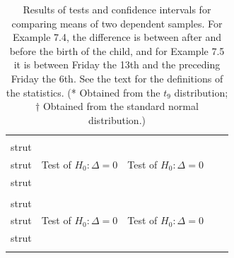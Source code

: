 \documentclass[11pt,a4paper,openany]{book}
\begin{document}
\begin{longtable}[]{@{}rrrrr@{}}
\caption{\label{tab:t-2tests-dep} Results of tests and confidence intervals
for comparing means of two dependent samples. For Example 7.4, the
difference is between after and before the birth of the child, and for
Example 7.5 it is between Friday the 13th and the preceding Friday the
6th. See the text for the definitions of the statistics. (* Obtained
from the \(t_{9}\) distribution; \(\dagger\) Obtained from the standard
normal distribution.)}\tabularnewline
\toprule
\begin{minipage}[b]{0.29\columnwidth}\raggedleft\strut
\\strut
\end{minipage} & \begin{minipage}[b]{0.13\columnwidth}\raggedleft\strut
\\strut
\end{minipage} & \begin{minipage}[b]{0.18\columnwidth}\raggedleft\strut
Test of \(H_{0}: \Delta=0\)\strut
\end{minipage} & \begin{minipage}[b]{0.13\columnwidth}\raggedleft\strut
Test of \(H_{0}: \Delta=0\)\strut
\end{minipage} & \begin{minipage}[b]{0.12\columnwidth}\raggedleft\strut
\\strut
\end{minipage}\tabularnewline
\midrule
\endfirsthead
\toprule
\begin{minipage}[b]{0.29\columnwidth}\raggedleft\strut
\\strut
\end{minipage} & \begin{minipage}[b]{0.13\columnwidth}\raggedleft\strut
\\strut
\end{minipage} & \begin{minipage}[b]{0.18\columnwidth}\raggedleft\strut
Test of \(H_{0}: \Delta=0\)\strut
\end{minipage} & \begin{minipage}[b]{0.13\columnwidth}\raggedleft\strut
Test of \(H_{0}: \Delta=0\)\strut
\end{minipage} & \begin{minipage}[b]{0.12\columnwidth}\raggedleft\strut
\\strut
\end{minipage}\tabularnewline
\midrule
\endhead
\begin{minipage}[t]{0.29\columnwidth}\raggedleft\strut

\end{minipage}
\end{longtable}
\end{document}
